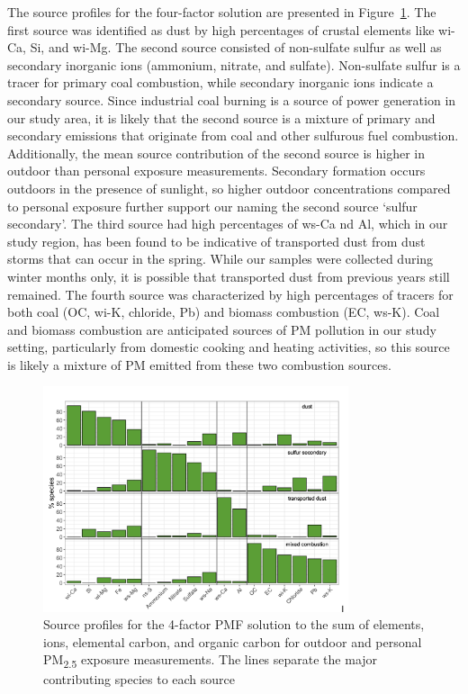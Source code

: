 \documentclass[
  letterpaper,
  DIV=11,
  numbers=noendperiod]{scrartcl}
\begin{document}
The source profiles for the four-factor solution are presented in
Figure~\ref{fig-source-figure}. The first source was identified as dust
by high percentages of crustal elements like wi-Ca, Si, and wi-Mg. The
second source consisted of non-sulfate sulfur as well as secondary
inorganic ions (ammonium, nitrate, and sulfate). Non-sulfate sulfur is a
tracer for primary coal combustion, while secondary inorganic ions
indicate a secondary source. Since industrial coal burning is a source
of power generation in our study area, it is likely that the second
source is a mixture of primary and secondary emissions that originate
from coal and other sulfurous fuel combustion. Additionally, the mean
source contribution of the second source is higher in outdoor than
personal exposure measurements. Secondary formation occurs outdoors in
the presence of sunlight, so higher outdoor concentrations compared to
personal exposure further support our naming the second source `sulfur
secondary'. The third source had high percentages of ws-Ca nd Al, which
in our study region, has been found to be indicative of transported dust
from dust storms that can occur in the spring. While our samples were
collected during winter months only, it is possible that transported
dust from previous years still remained. The fourth source was
characterized by high percentages of tracers for both coal (OC, wi-K,
chloride, Pb) and biomass combustion (EC, ws-K). Coal and biomass
combustion are anticipated sources of PM pollution in our study setting,
particularly from domestic cooking and heating activities, so this
source is likely a mixture of PM emitted from these two combustion
sources.

\begin{figure}[H]

{\centering \includegraphics[width=0.8\textwidth,height=\textheight]{images/source-figure.png}

}

\caption{\label{fig-source-figure}Source profiles for the 4-factor PMF
solution to the sum of elements, ions, elemental carbon, and organic
carbon for outdoor and personal PM\textsubscript{2.5} exposure
measurements. The lines separate the major contributing species to each
source}

\end{figure}
\end{document}
